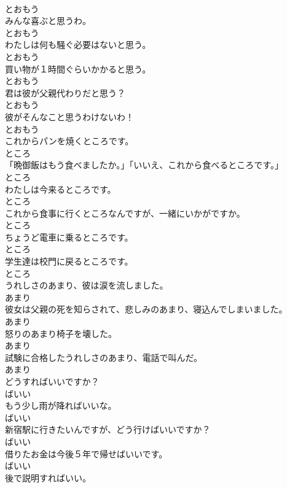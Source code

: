 \documentclass[8pt]{extreport}
\begin{document}
\begin{CJK}{UTF8}{min}
\\	とおもう
\\	みんな喜ぶと思うわ。	
\\	とおもう
\\	わたしは何も騒ぐ必要はないと思う。	
\\	とおもう
\\	買い物が１時間ぐらいかかると思う。	
\\	とおもう
\\	君は彼が父親代わりだと思う？	
\\	とおもう
\\	彼がそんなこと思うわけないわ！	
\\	とおもう
\\	これからパンを焼くところです。	
\\	ところ
\\	「晩御飯はもう食べましたか。」「いいえ、これから食べるところです。」	
\\	ところ
\\	わたしは今来るところです。	
\\	ところ
\\	これから食事に行くところなんですが、一緒にいかがですか。	
\\	ところ
\\	ちょうど電車に乗るところです。	
\\	ところ
\\	学生達は校門に戻るところです。	
\\	ところ
\\	うれしさのあまり、彼は涙を流しました。	
\\	あまり
\\	彼女は父親の死を知らされて、悲しみのあまり、寝込んでしまいました。	
\\	あまり
\\	怒りのあまり椅子を壊した。	
\\	あまり
\\	試験に合格したうれしさのあまり、電話で叫んだ。	
\\	あまり
\\	どうすればいいですか？	
\\	ばいい
\\	もう少し雨が降ればいいな。	
\\	ばいい
\\	新宿駅に行きたいんですが、どう行けばいいですか？	
\\	ばいい
\\	借りたお金は今後５年で帰せばいいです。	
\\	ばいい
\\	後で説明すればいい。	

\end{CJK}
\end{document}
